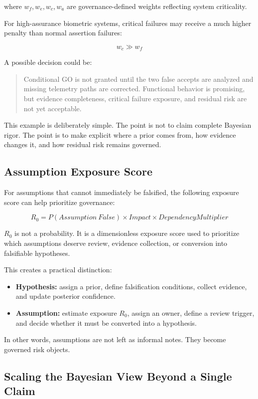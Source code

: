\documentclass[11pt,a4paper]{article}
\begin{document}
where \(w_f, w_e, w_c, w_a\) are governance-defined weights reflecting system criticality.

For high-assurance biometric systems, critical failures may receive a much higher penalty than normal assertion failures:

\[
w_c \gg w_f
\]

A possible decision could be:

\begin{quote}
Conditional GO is not granted until the two false accepts are analyzed and missing telemetry paths are corrected. Functional behavior is promising, but evidence completeness, critical failure exposure, and residual risk are not yet acceptable.
\end{quote}

This example is deliberately simple. The point is not to claim complete Bayesian rigor. The point is to make explicit where a prior comes from, how evidence changes it, and how residual risk remains governed.

\subsection{Assumption Exposure Score}

For assumptions that cannot immediately be falsified, the following exposure score can help prioritize governance:

\[
R_0 = P(Assumption\ False) \times Impact \times DependencyMultiplier
\]

\(R_0\) is not a probability. It is a dimensionless exposure score used to prioritize which assumptions deserve review, evidence collection, or conversion into falsifiable hypotheses.

This creates a practical distinction:
\begin{itemize}
\item \textbf{Hypothesis:} assign a prior, define falsification conditions, collect evidence, and update posterior confidence.
\item \textbf{Assumption:} estimate exposure \(R_0\), assign an owner, define a review trigger, and decide whether it must be converted into a hypothesis.
\end{itemize}

In other words, assumptions are not left as informal notes. They become governed risk objects.

\subsection{Scaling the Bayesian View Beyond a Single Claim}
\end{document}
